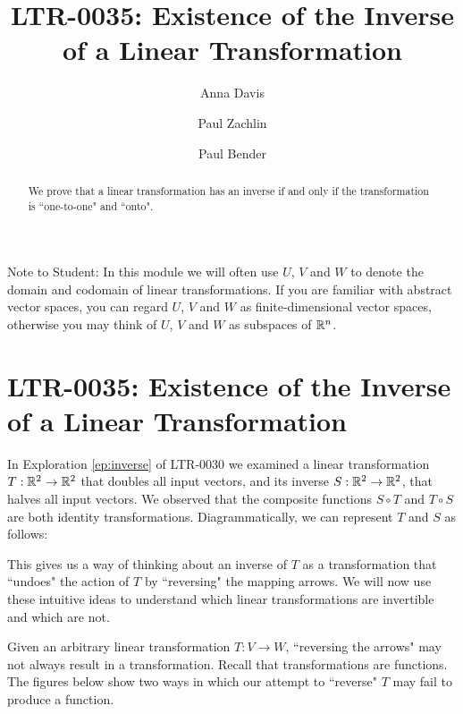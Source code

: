 \documentclass{ximera}
\author{Anna Davis \and Paul Zachlin \and Paul Bender} \title{LTR-0035: Existence of the Inverse of a Linear Transformation} \license{CC-BY 4.0}
\begin{document}
\begin{abstract}
  We prove that a linear transformation has an inverse if and only if the transformation is ``one-to-one" and ``onto".
\end{abstract}
\maketitle

Note to Student:  In this module we will often use $U$, $V$ and $W$ to denote the domain and codomain of linear transformations.  If you are familiar with abstract vector spaces, you can regard $U$, $V$ and $W$ as finite-dimensional vector spaces, otherwise you may think of $U$, $V$ and $W$ as subspaces of $\mathbb{R}^n$. 

\section{LTR-0035: Existence of the Inverse of a Linear Transformation}

In Exploration \ref{ep:inverse} of LTR-0030 we examined a linear transformation $T:\mathbb{R}^2\rightarrow \mathbb{R}^2$ that doubles all input vectors, and its inverse $S:\mathbb{R}^2\rightarrow \mathbb{R}^2$, that halves all input vectors.  We observed that the composite functions $S\circ T$ and $T\circ S$ are both identity transformations.  Diagrammatically, we can represent $T$ and $S$ as follows:
 
\begin{center}
 \end{center} 

This gives us a way of thinking about an inverse of $T$ as a transformation that ``undoes" the action of $T$ by ``reversing" the mapping arrows.  We will now use these intuitive ideas to understand which linear transformations are invertible and which are not.

Given an arbitrary linear transformation $T:V\rightarrow W$, ``reversing the arrows"
 may not always result in a transformation. Recall that transformations are functions.  The figures below show two ways in which our attempt to ``reverse" $T$ may fail to produce a function.
 
\end{document}
